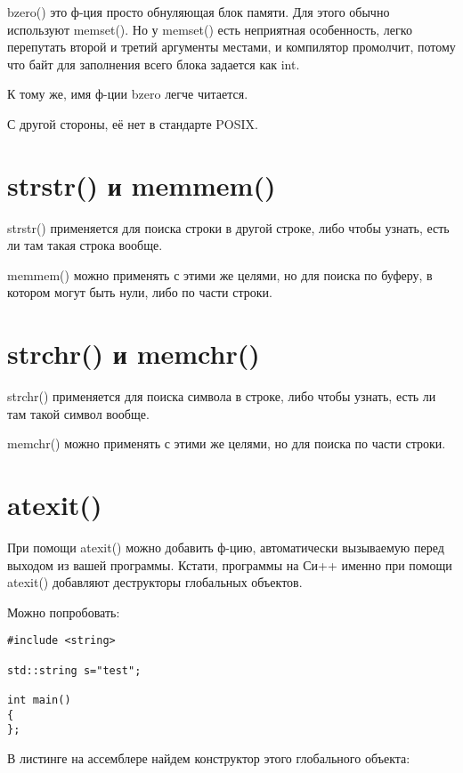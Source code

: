 bzero() это ф-ция просто обнуляющая блок памяти.
Для этого обычно используют memset(). Но у memset() есть неприятная особенность, легко перепутать второй
и третий аргументы местами, и компилятор промолчит, потому что байт для заполнения всего блока задается как int.

К тому же, имя ф-ции bzero легче читается.

С другой стороны, её нет в стандарте POSIX.



\section{strstr() и memmem()}

strstr() применяется для поиска строки в другой строке, либо чтобы узнать, есть ли там такая строка вообще.

memmem() можно применять с этими же целями, но для поиска по буферу, в котором могут быть нули,
либо по части строки.

\label{memchr}
\section{strchr() и memchr()}

strchr() применяется для поиска символа в строке, либо чтобы узнать, есть ли там такой символ вообще.

memchr() можно применять с этими же целями, но для поиска по части строки.

\section{atexit()}

При помощи atexit() можно добавить ф-цию, автоматически вызываемую перед выходом из вашей программы.
Кстати, программы на Си++ именно при помощи atexit() добавляют деструкторы глобальных объектов.

Можно попробовать:

\begin{lstlisting}
#include <string>

std::string s="test";

int main()
{
};
\end{lstlisting}

В листинге на ассемблере найдем конструктор этого глобального объекта:

